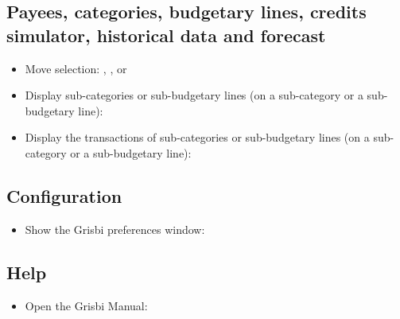 \subsection{Payees, categories, budgetary lines, credits simulator, historical data and forecast}

\begin{itemize}
	\item Move selection: \keys{\arrowkeyup}, \keys{\arrowkeydown},  or 
	\item Display sub-categories or sub-budgetary lines (on a sub-category or a sub-budgetary line): \keys{{+}}
	\item Display the transactions of sub-categories or sub-budgetary lines (on a sub-category or a sub-budgetary line): 
\end{itemize}

\subsection{Configuration}

\begin{itemize}
	\item Show the Grisbi preferences window: 
\end{itemize}


\subsection{Help}

\begin{itemize}
	\item Open the Grisbi Manual: 
\end{itemize}
